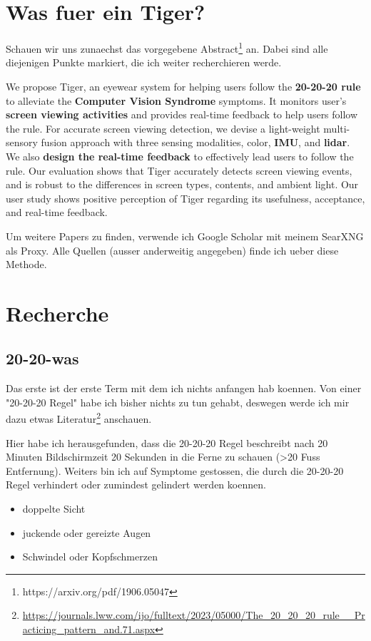 
\section{Was fuer ein Tiger?}

Schauen wir uns zunaechst das vorgegebene Abstract\footnote{https://arxiv.org/pdf/1906.05047}
an. Dabei sind alle diejenigen Punkte markiert, die ich weiter recherchieren werde.

We propose Tiger, an eyewear system for helping users follow the \textbf{20-20-20 rule} to alleviate the \textbf{Computer Vision Syndrome} symptoms. It monitors user’s \textbf{screen viewing activities} and provides real-time feedback to help users follow the rule. For accurate screen viewing detection, we devise a light-weight multi-sensory fusion approach with three sensing modalities, color, \textbf{IMU}, and \textbf{lidar}. We also \textbf{design the real-time feedback} to effectively lead users to follow the rule. Our evaluation shows that Tiger accurately detects screen viewing events, and is robust to the differences in screen types, contents, and ambient light. Our user study shows positive perception of Tiger regarding its usefulness, acceptance, and real-time feedback.

Um weitere Papers zu finden, verwende ich Google Scholar mit meinem SearXNG als Proxy. Alle Quellen (ausser anderweitig angegeben) finde ich ueber diese Methode.

\section{Recherche}

\subsection{20-20-was}

Das erste ist der erste Term mit dem ich nichts anfangen hab koennen. Von einer "20-20-20 Regel" habe ich bisher nichts zu tun gehabt, deswegen werde 
ich mir dazu etwas Literatur\footnote{\url{https://journals.lww.com/ijo/fulltext/2023/05000/The_20_20_20_rule__Practicing_pattern_and.71.aspx}} anschauen.

Hier habe ich herausgefunden, dass die 20-20-20 Regel beschreibt nach 20 Minuten Bildschirmzeit 20 Sekunden in die Ferne zu schauen (>20 Fuss Entfernung). 
Weiters bin ich auf Symptome gestossen, die durch die 20-20-20 Regel verhindert oder zumindest gelindert werden koennen.

\begin{itemize}
  \item doppelte Sicht
  \item juckende oder gereizte Augen
  \item Schwindel oder Kopfschmerzen
\end{itemize}

